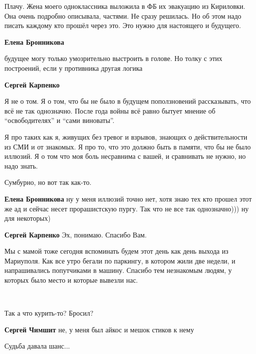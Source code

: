 
Плачу. Жена моего одноклассника выложила в ФБ их эвакуацию из Кириловки. Она
очень подробно описывала, частями. Не сразу решилась. Но об этом надо писать
каждому кто прошёл через это. Это нужно для настоящего и будущего.

\begin{itemize} %
\textbf{Елена Бронникова} 

будущее могу только умозрительно выстроить в голове. Но толку с этих
построений, если у противника другая логика

\textbf{Сергей Карпенко} 

Я не о том. Я о том, что бы не было в будущем поползновений рассказывать, что
всё не так однозначно. После года войны всё равно бытует мнение об
\enquote{освободителях} и \enquote{сами виноваты}.

Я про таких как я, живущих без тревог и взрывов, знающих о действительности из
СМИ и от знакомых. Я про то, что это должно быть в памяти, что бы не было
иллюзий. Я о том что моя боль несравнима с вашей, и сравнивать не нужно, но
надо знать.

Сумбурно, но вот так как-то.

\textbf{Елена Бронникова} ну у меня иллюзий точно нет, хотя знаю тех кто прошел этот же ад и сейчас несет прорашистскую пургу. Так что не все так однозначно))) ну для некоторых)

\textbf{Сергей Карпенко} Эх, понимаю. Спасибо Вам.
\end{itemize} %


Мы с мамой тоже сегодня вспоминать будем этот день как день выхода из
Мариуполя. Как все утро бегали по паркингу, в котором жили две недели, и
напрашивались попутчиками в машину. Спасибо тем незнакомым людям, у которых
было место и которые вывезли нас.


🙌🙌🙌🙌🙌🙌🙌


Так а что курить-то? Бросил? 🙂

\begin{itemize} %
\textbf{Сергей Чимшит} не, у меня был айкос и мешок стиков к нему 🤣

Судьба давала шанс...
\end{itemize} %

